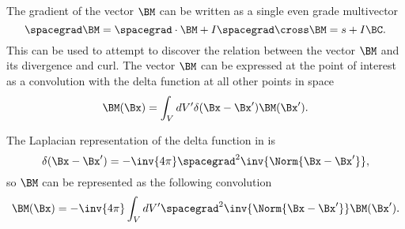 %
%
The gradient of the vector \( \BM \) can be written as a single even grade multivector
%
\begin{equation}\label{eqn:helmholtzDerviationMultivector:60}
\spacegrad \BM
= \spacegrad \cdot \BM + I \spacegrad \cross \BM
= s + I \BC.
\end{equation}
%
%
%
%
This can be used to attempt to discover the relation between the vector \( \BM \) and its divergence and curl.  
The vector \( \BM \) can be expressed at the point of interest as a convolution with the delta function at all other points in space
\begin{equation}\label{eqn:helmholtzDerviationMultivector:80}
\BM(\Bx) = \int_V dV' \delta(\Bx - \Bx') \BM(\Bx').
\end{equation}

The Laplacian representation of the delta function in  is
\begin{equation}\label{eqn:helmholtzDerviationMultivector:100}
\delta(\Bx - \Bx') = -\inv{4\pi} \spacegrad^2 \inv{\Norm{\Bx - \Bx'}},
\end{equation}
so \( \BM \) can be represented as the following convolution
\begin{equation}\label{eqn:helmholtzDerviationMultivector:120}
\BM(\Bx) = -\inv{4\pi} \int_V dV' \spacegrad^2 \inv{\Norm{\Bx - \Bx'}} \BM(\Bx').
\end{equation}

%
%

